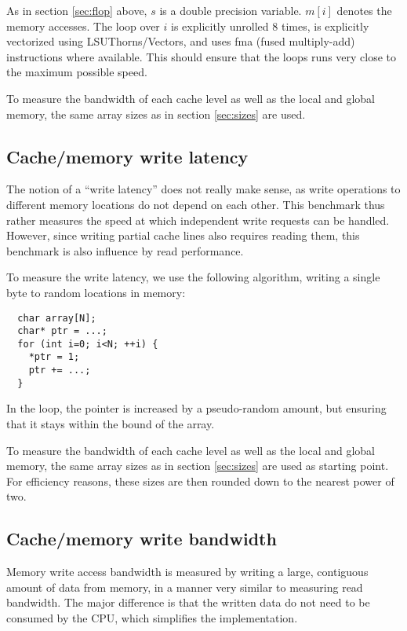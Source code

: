 As in section \ref{sec:flop} above, $s$ is a double precision
variable. $m[i]$ denotes the memory accesses. The loop over $i$ is
explicitly unrolled $8$ times, is explicitly vectorized using
LSUThorns/Vectors, and uses fma (fused multiply-add) instructions
where available. This should ensure that the loops runs very close to
the maximum possible speed.

To measure the bandwidth of each cache level as well as the local and
global memory, the same array sizes as in section \ref{sec:sizes} are
used.

\subsection{Cache/memory write latency}
\label{sec:write-latency}

The notion of a ``write latency'' does not really make sense, as write
operations to different memory locations do not depend on each other.
This benchmark thus rather measures the speed at which independent write
requests can be handled. However, since writing partial cache lines
also requires reading them, this benchmark is also influence by read
performance.

To measure the write latency, we use the following algorithm, writing
a single byte to random locations in memory:
\begin{verbatim}
  char array[N];
  char* ptr = ...;
  for (int i=0; i<N; ++i) {
    *ptr = 1;
    ptr += ...;
  }
\end{verbatim}

In the loop, the pointer is increased by a pseudo-random amount, but
ensuring that it stays within the bound of the array.

To measure the bandwidth of each cache level as well as the local and
global memory, the same array sizes as in section \ref{sec:sizes} are
used as starting point. For efficiency reasons, these sizes are then
rounded down to the nearest power of two.

\subsection{Cache/memory write bandwidth}

Memory write access bandwidth is measured by writing a large,
contiguous amount of data from memory, in a manner very similar to
measuring read bandwidth. The major difference is that the written
data do not need to be consumed by the CPU, which simplifies the
implementation.

